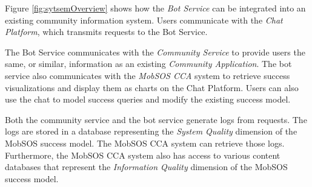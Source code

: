 Figure \ref{fig:sytsemOverview} shows how the \emph{Bot Service} can be integrated into an existing community information system. Users communicate with the \emph{Chat Platform}, which transmits requests to the Bot Service.

The Bot Service communicates with the \emph{Community Service} to provide users the same, or similar, information as an existing \emph{Community Application}. The bot service also communicates with the \emph{MobSOS CCA} system to retrieve success visualizations and display them as charts on the Chat Platform. Users can also use the chat to model success queries and modify the existing success model.

Both the community service and the bot service generate logs from requests. The logs are stored in a database representing the \emph{System Quality} dimension of the MobSOS success model. The MobSOS CCA system can retrieve those logs. Furthermore, the MobSOS CCA system also has access to various content databases that represent the \emph{Information Quality} dimension of the MobSOS success model.